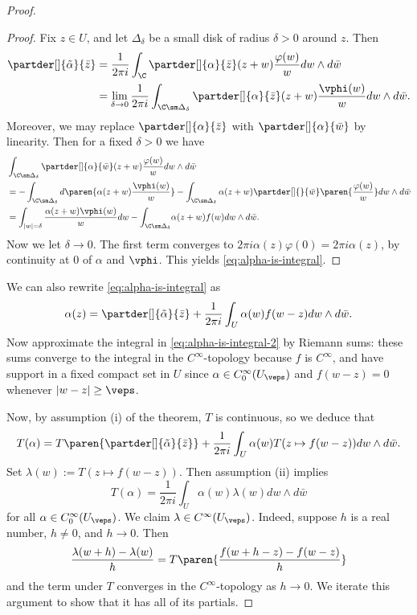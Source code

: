 \documentclass[11pt]{report}
\begin{document}
\begin{proof}
\begin{proof}
Fix $z \in U$, and let $\Delta_\delta$ be a small disk of radius $\delta >0$ around $z$. Then
\begin{align*}
    \partder[]{\tilde \alpha}{\bar z} &= \frac{1}{2\pi i }\int_\C \partder[]{\alpha}{\bar z}(z+w)\frac{\varphi (w)}{w}dw \land d \bar w \\
    &= \lim_{\delta \to 0}\frac{1}{2\pi i }\int_{\C \sm \Delta_\delta} \partder[]{\alpha}{\bar z}(z+w)\frac{\vphi (w)}w{dw \land d \bar w}.
\end{align*}
Moreover, we may replace $\partder[]{\alpha}{\bar z}$ with $\partder[]{\alpha}{\bar w}$ by linearity. Then for a fixed $\delta >0$ we have
\begin{align*}
    &\int_{\C \sm \Delta_\delta}\partder[]{\alpha}{\bar w}(z+w)\frac{\varphi(w)}{w}dw \land d \bar w  \\&= -\int_{\C \sm \Delta_\delta} d\paren{ \alpha(z+w)\frac{\vphi(w)}w}-\int_{\C \sm \Delta _\delta} \alpha (z+w)\partder[]{}{\bar w}\paren{\frac{\varphi(w)}{w}}dw \land d \bar w \\
    &= \int_{|w| = \delta}\frac{\alpha(z+w)\vphi(w)}w{dw - \int_{\C \sm \Delta_\delta}}\alpha (z+w)f(w)dw \land d \bar w.
\end{align*}
Now we let $\delta \to 0$. The first term converges to $2\pi i \alpha(z)\varphi (0)=2\pi i\alpha(z)$, by continuity at $0$ of $\alpha$ and $\vphi$. This yields \eqref{eq:alpha-is-integral}.
\end{proof}
We can also rewrite \eqref{eq:alpha-is-integral} as
\begin{equation} \label{eq:alpha-is-integral-2}
\alpha(z) = \partder[]{\tilde \alpha}{\bar z} + \frac{1}{2\pi i }\int _U \alpha(w)f(w-z)dw \land d\bar w.
\end{equation}
Now approximate the integral in \eqref{eq:alpha-is-integral-2} by Riemann sums: these sums converge to the integral in the $C^\infty$-topology because $f$ is $C^\infty$, and have support in a fixed compact set in $U$ since $\alpha \in C_0^\infty (U_\veps)$ and $f(w-z)=0$ whenever $|w-z| \geq \veps$.

Now, by assumption (i) of the theorem, $T$ is continuous, so we deduce that
\[
T(\alpha)=T\paren{\partder[]{\tilde \alpha}{\bar z}}+\frac{1}{2\pi i }\int_U \alpha (w)T(z \mapsto f(w-z))dw \land d \bar w.
\]
Set $\lambda (w) := T(z \mapsto f(w-z))$. Then assumption (ii) implies
\begin{equation} \label{eq:T-is-integral}
    T(\alpha) = \frac{1}{2\pi i }\int_U\alpha (w)\lambda (w)dw \land d \bar w
\end{equation}
for all $\alpha \in C_0^\infty (U_\veps)$. We claim $\lambda \in C^\infty (U_\veps)$. Indeed, suppose $h$ is a real number, $h\neq0$, and $h \to 0$. Then 
\[
\frac{\lambda(w+h)-\lambda(w)}{h}=T\paren{\frac{f(w+h-z)-f(w-z)}h{}}
\]
and the term under $T$ converges in the $C^\infty$-topology as $h \to 0$. We iterate this argument to show that it has all of its partials.


\end{proof}
\end{document}
